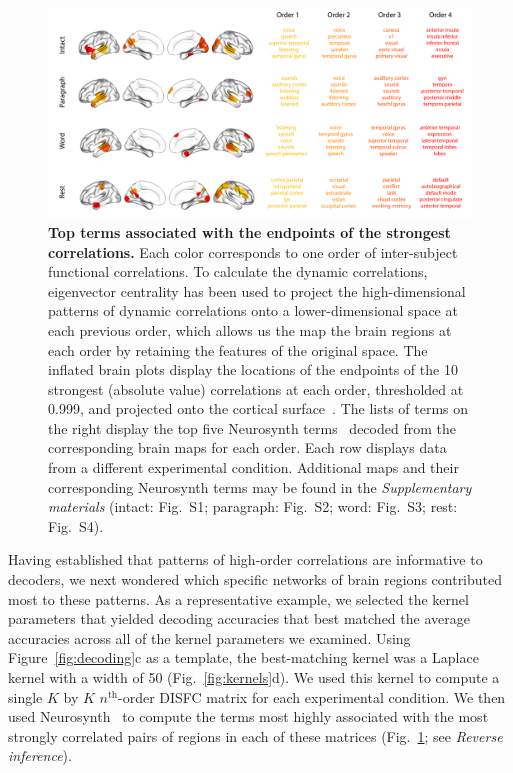 \documentclass[english]{article}
\newcommand{\intact}{S1}
\newcommand{\para}{S2}
\newcommand{\word}{S3}
\newcommand{\rest}{S4}
\begin{document}
\begin{figure}[tp]
  \centering
  \includegraphics[width=\textwidth]{figs/most_abs}
  \caption{\textbf{Top terms associated with the endpoints of the
      strongest correlations.}  Each color corresponds to one order of
    inter-subject functional correlations.  To calculate the dynamic
    correlations, eigenvector centrality has been used to project
    the high-dimensional patterns of dynamic correlations onto a
    lower-dimensional space at each previous order, which allows us
    the map the brain regions at each order by retaining the
    features of the original space. The inflated brain plots
    display the locations of the endpoints of the 10 strongest
    (absolute value) correlations at each order, thresholded at 0.999,
    and projected onto the cortical surface~\citep{CombEtal19}.  The
    lists of terms on the right display the top five Neurosynth
    terms~\citep{RubiEtal17} decoded from the corresponding brain maps
    for each order.  Each row displays data from a different
    experimental condition.  Additional maps and their corresponding
    Neurosynth terms may be found in the \textit{Supplementary
      materials} (intact: Fig.~\intact; paragraph: Fig.~\para; word:
    Fig.~\word; rest: Fig.~\rest).}
  \label{fig:neurosynth}
\end{figure}

Having established that patterns of high-order correlations are
informative to decoders, we next wondered which specific networks of
brain regions contributed most to these patterns.  As a representative
example, we selected the kernel parameters that yielded decoding
accuracies that best matched the average accuracies across all of the
kernel parameters we examined.  Using Figure~\ref{fig:decoding}c as a
template, the best-matching kernel was a Laplace kernel with a width
of 50 (Fig.~\ref{fig:kernels}d).  We used this kernel to compute a
single $K$ by $K$ $n^\mathrm{th}$-order DISFC matrix for each
experimental condition.  We then used Neurosynth~\citep{RubiEtal17} to
compute the terms most highly associated with the most strongly
correlated pairs of regions in each of these matrices
(Fig.~\ref{fig:neurosynth}; see \textit{Reverse inference}).
\end{document}
